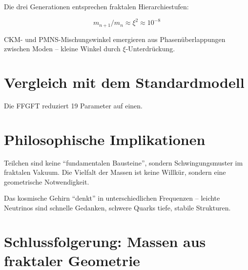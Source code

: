 	Die drei Generationen entsprechen fraktalen Hierarchiestufen:
	
	\begin{equation}
		m_{n+1}/m_n \approx \xi^2 \approx 10^{-8}
	\end{equation}
	
	CKM- und PMNS-Mischungswinkel emergieren aus Phasenüberlappungen zwischen Moden – kleine Winkel durch \(\xi\)-Unterdrückung.
	
	\section{Vergleich mit dem Standardmodell}
	
\begin{center}
	\small
\end{center}
	
	Die FFGFT reduziert 19 Parameter auf einen.
	
	\section{Philosophische Implikationen}
	
	Teilchen sind keine \enquote{fundamentalen Bausteine}, sondern Schwingungsmuster im fraktalen Vakuum. Die Vielfalt der Massen ist keine Willkür, sondern eine geometrische Notwendigkeit.
	
	Das kosmische Gehirn \enquote{denkt} in unterschiedlichen Frequenzen – leichte Neutrinos sind schnelle Gedanken, schwere Quarks tiefe, stabile Strukturen.
	
	\section{Schlussfolgerung: Massen aus fraktaler Geometrie}
	
